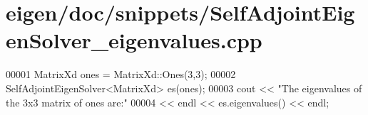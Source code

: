 \hypertarget{eigen_2doc_2snippets_2_self_adjoint_eigen_solver__eigenvalues_8cpp_source}{}\section{eigen/doc/snippets/\+Self\+Adjoint\+Eigen\+Solver\+\_\+eigenvalues.cpp}
\label{eigen_2doc_2snippets_2_self_adjoint_eigen_solver__eigenvalues_8cpp_source}

\begin{DoxyCode}
00001 MatrixXd ones = MatrixXd::Ones(3,3);
00002 SelfAdjointEigenSolver<MatrixXd> es(ones);
00003 cout << \textcolor{stringliteral}{"The eigenvalues of the 3x3 matrix of ones are:"} 
00004      << endl << es.eigenvalues() << endl;
\end{DoxyCode}
